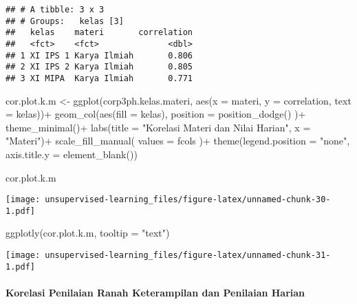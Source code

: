 \documentclass[
]{article}
\newenvironment{Shaded}{\begin{snugshade}}{\end{snugshade}}
\newcommand{\AttributeTok}[1]{\textcolor[rgb]{0.77,0.63,0.00}{#1}}
\newcommand{\FunctionTok}[1]{\textcolor[rgb]{0.00,0.00,0.00}{#1}}
\newcommand{\NormalTok}[1]{#1}
\newcommand{\OtherTok}[1]{\textcolor[rgb]{0.56,0.35,0.01}{#1}}
\newcommand{\SpecialCharTok}[1]{\textcolor[rgb]{0.00,0.00,0.00}{#1}}
\newcommand{\StringTok}[1]{\textcolor[rgb]{0.31,0.60,0.02}{#1}}
\begin{document}
\begin{verbatim}
## # A tibble: 3 x 3
## # Groups:   kelas [3]
##   kelas    materi       correlation
##   <fct>    <fct>              <dbl>
## 1 XI IPS 1 Karya Ilmiah       0.806
## 2 XI IPS 2 Karya Ilmiah       0.805
## 3 XI MIPA  Karya Ilmiah       0.771
\end{verbatim}

\begin{Shaded}
\begin{Highlighting}[]
\NormalTok{cor.plot.k.m }\OtherTok{\textless{}{-}} 
\FunctionTok{ggplot}\NormalTok{(corp3ph.kelas.materi, }
       \FunctionTok{aes}\NormalTok{(}\AttributeTok{x =}\NormalTok{ materi, }
           \AttributeTok{y =}\NormalTok{ correlation,}
           \AttributeTok{text =}\NormalTok{ kelas))}\SpecialCharTok{+}
  \FunctionTok{geom\_col}\NormalTok{(}\FunctionTok{aes}\NormalTok{(}\AttributeTok{fill =}\NormalTok{ kelas), }
           \AttributeTok{position =} \FunctionTok{position\_dodge}\NormalTok{()}
\NormalTok{           )}\SpecialCharTok{+}
    \FunctionTok{theme\_minimal}\NormalTok{()}\SpecialCharTok{+}
  \FunctionTok{labs}\NormalTok{(}\AttributeTok{title =} \StringTok{"Korelasi Materi dan Nilai Harian"}\NormalTok{,}
       \AttributeTok{x =} \StringTok{"Materi"}\NormalTok{)}\SpecialCharTok{+}
    \FunctionTok{scale\_fill\_manual}\NormalTok{(}
    \AttributeTok{values =}\NormalTok{ fcols      }
\NormalTok{  )}\SpecialCharTok{+}
  \FunctionTok{theme}\NormalTok{(}\AttributeTok{legend.position =} \StringTok{"none"}\NormalTok{,}
        \AttributeTok{axis.title.y =} \FunctionTok{element\_blank}\NormalTok{())}

\NormalTok{cor.plot.k.m}
\end{Highlighting}
\end{Shaded}

\texttt{[image: unsupervised-learning\_files/figure-latex/unnamed-chunk-30-1.pdf]}

\begin{Shaded}
\begin{Highlighting}[]
\FunctionTok{ggplotly}\NormalTok{(cor.plot.k.m, }\AttributeTok{tooltip =} \StringTok{"text"}\NormalTok{)}
\end{Highlighting}
\end{Shaded}

\texttt{[image: unsupervised-learning\_files/figure-latex/unnamed-chunk-31-1.pdf]}

\hypertarget{korelasi-penilaian-ranah-keterampilan-dan-penilaian-harian}{%
\paragraph{Korelasi Penilaian Ranah Keterampilan dan Penilaian
Harian}\label{korelasi-penilaian-ranah-keterampilan-dan-penilaian-harian}}
\end{document}
